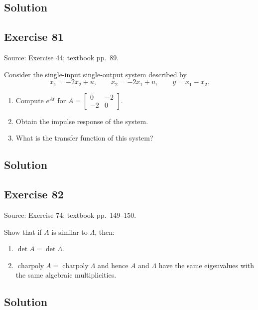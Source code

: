 \documentclass[12pt,a4paper]{article}
\newlength{\questionroom}
\newenvironment{questionprompt}{%
  \begin{lrbox}{\questionbox}\begin{minipage}{\linewidth}%
}{%
  \end{minipage}\end{lrbox}%
  \setlength{\questionroom}{\dimexpr\ht\questionbox+\dp\questionbox+5.2cm\relax}%
  \ifdim\questionroom>\textheight\setlength{\questionroom}{\textheight}\fi
  \Needspace{\questionroom}%
  \noindent\usebox{\questionbox}\par
}
\begin{document}
\subsection*{Solution}
\vspace{3.5cm}


\begin{questionprompt}
\section*{Exercise 81}
\label{practice:81}
{\small Source: Exercise 44; textbook pp.~89.}\par
Consider the single-input single-output system described by
\[\dot x_1=-2x_2+u,\qquad\dot x_2=-2x_1+u,\qquad y=x_1-x_2.\]
\begin{enumerate}[label=(\alph*)]
\item Compute $e^{At}$ for $A=\begin{bmatrix}0&-2\\-2&0\end{bmatrix}$.
\item Obtain the impulse response of the system.
\item What is the transfer function of this system?
\end{enumerate}
\end{questionprompt}
\subsection*{Solution}
\vspace{3.5cm}


\begin{questionprompt}
\section*{Exercise 82}
\label{practice:82}
{\small Source: Exercise 74; textbook pp.~149--150.}\par
Show that if $A$ is similar to $\Lambda$, then:
\begin{enumerate}[label=(\alph*)]
\item $\det A=\det\Lambda$.
\item $\operatorname{charpoly}A=\operatorname{charpoly}\Lambda$ and hence $A$ and $\Lambda$ have the same eigenvalues with the same algebraic multiplicities.
\end{enumerate}
\end{questionprompt}
\subsection*{Solution}
\vspace{3.5cm}
\end{document}
